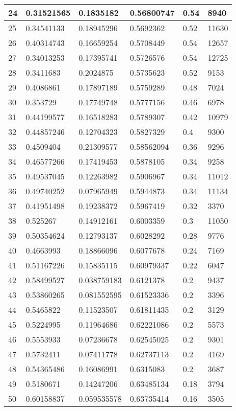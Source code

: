 \begin{longtable}{|l|l|l|l|l|l|}
24 & 0.31521565 & 0.1835182 & 0.56800747 & 0.54 & 8940 \\ \hline 
25 & 0.34541133 & 0.18945296 & 0.5692362 & 0.52 & 11630 \\ \hline 
26 & 0.40314743 & 0.16659254 & 0.5708449 & 0.54 & 12657 \\ \hline 
27 & 0.34013253 & 0.17395741 & 0.5726576 & 0.54 & 12725 \\ \hline 
28 & 0.3411683 & 0.2024875 & 0.5735623 & 0.52 & 9153 \\ \hline 
29 & 0.4086861 & 0.17897189 & 0.5759289 & 0.48 & 7024 \\ \hline 
30 & 0.353729 & 0.17749748 & 0.5777156 & 0.46 & 6978 \\ \hline 
31 & 0.44199577 & 0.16518283 & 0.5789307 & 0.42 & 10979 \\ \hline 
32 & 0.44857246 & 0.12704323 & 0.5827329 & 0.4 & 9300 \\ \hline 
33 & 0.4509404 & 0.21309577 & 0.58562094 & 0.36 & 9296 \\ \hline 
34 & 0.46577266 & 0.17419453 & 0.5878105 & 0.34 & 9258 \\ \hline 
35 & 0.49537045 & 0.12263982 & 0.5906967 & 0.34 & 11012 \\ \hline 
36 & 0.49740252 & 0.07965949 & 0.5944873 & 0.34 & 11134 \\ \hline 
37 & 0.41951498 & 0.19238372 & 0.5967419 & 0.32 & 3370 \\ \hline 
38 & 0.525267 & 0.14912161 & 0.6003359 & 0.3 & 11050 \\ \hline 
39 & 0.50354624 & 0.12793137 & 0.6028292 & 0.28 & 9776 \\ \hline 
40 & 0.4663993 & 0.18866096 & 0.6077678 & 0.24 & 7169 \\ \hline 
41 & 0.51167226 & 0.15835115 & 0.60979337 & 0.22 & 6047 \\ \hline 
42 & 0.58499527 & 0.038759183 & 0.6121378 & 0.2 & 9437 \\ \hline 
43 & 0.53860265 & 0.081552595 & 0.61523336 & 0.2 & 3396 \\ \hline 
44 & 0.5465822 & 0.11523507 & 0.61811435 & 0.2 & 3129 \\ \hline 
45 & 0.5224995 & 0.11964686 & 0.62221086 & 0.2 & 5573 \\ \hline 
46 & 0.5553933 & 0.07236678 & 0.62545025 & 0.2 & 9301 \\ \hline 
47 & 0.5732411 & 0.07411778 & 0.62737113 & 0.2 & 4169 \\ \hline 
48 & 0.54365486 & 0.16086991 & 0.6315083 & 0.2 & 3687 \\ \hline 
49 & 0.5180671 & 0.14247206 & 0.63485134 & 0.18 & 3794 \\ \hline 
50 & 0.60158837 & 0.059535578 & 0.63735414 & 0.16 & 3505 \\ \hline 
\end{longtable}
